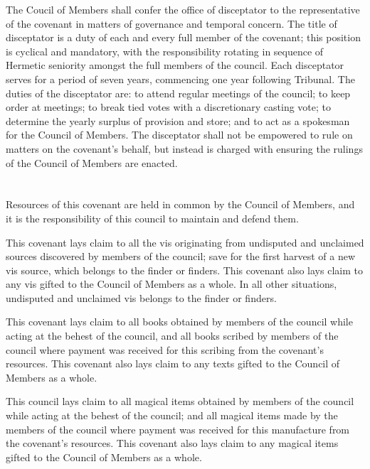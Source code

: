 \documentclass [a3paper,portrait,20pt]{article}
\begin{document}
\begin{multicols}{2}
\begin{small}
	The Coucil of Members shall confer the office of disceptator to the representative of the covenant in
	matters of governance and temporal concern. The title of disceptator is a duty of each and every full
	member of the covenant; this position is cyclical and mandatory, with the responsibility rotating in
	sequence of Hermetic seniority amongst the full members of the council. Each disceptator serves for a
	period of seven years, commencing one year following Tribunal. The duties of the disceptator are: to
	attend regular meetings of the council; to keep order at meetings; to break tied votes with a
	discretionary casting vote; to determine the yearly surplus of provision and store; and to act as a
	spokesman for the Council of Members. The disceptator shall not be empowered to rule on matters on the
	covenant's behalf, but instead is charged with ensuring the rulings of the Council of Members are
	enacted.
	
\section*{\fontsize{35}{40}\selectfont{Resources Owned by this Covenant}}
	Resources of this covenant are held in common by the Council of Members, and it is the responsibility
	of this council to maintain and defend them.
	
	This covenant lays claim to all the vis originating from undisputed and unclaimed sources discovered by
	members of the council; save for the first harvest of a new vis source, which belongs to the finder or
	finders. This covenant also lays claim to any vis gifted to the Council of Members as a whole. In all
	other situations, undisputed and unclaimed vis belongs to the finder or finders.
	
	This covenant lays claim to all books obtained by members of the council while acting at the behest of
	the council, and all books scribed by members of the council where payment was received for this
	scribing from the covenant's resources. This covenant also lays claim to any texts gifted to the Council
	of Members as a whole.
	
	This council lays claim to all magical items obtained by members of the council while acting at the
	behest of the council; and all magical items made by the members of the council where payment was
	received for this manufacture from the covenant's resources. This covenant also lays claim to any
	magical items gifted to the Council of Members as a whole.
	

\end{small}
\end{multicols}
\end{document}
